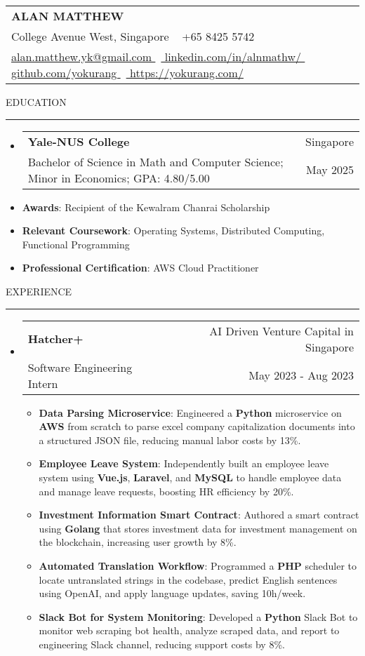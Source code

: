 \documentclass[letterpaper, 11pt]{article}
\makeatletter
\def\sectionlineskip{\medskip}
\def\sectionskip{\medskip}
\def\namesize{\LARGE}
\newcommand{\ResumeHeader}[6]{
  \noindent
  \begin{tabularx}{\textwidth}{>{\centering\arraybackslash}X}
    \namesize\MakeUppercase{\textbf{\fullname}} \\
    #1 \textbar\ #2 \\
    #3 \textbar\ #4 \textbar\ #5 \textbar\ #6 \\
  \end{tabularx}
}
\def \fullname { Alan Matthew }
\def \linkedinlink { https://www.linkedin.com/in/alnmathw/ }
\def \linkedintext { linkedin.com/in/alnmathw/ }
\def \phonenumber { +65 8425 5742 }
\def \githublink { https://github.com/yokurang }
\def \githubtext { github.com/yokurang }
\def \emaillink { mailto:alan.matthew.yk@gmail.com }
\def \emailtext { alan.matthew.yk@gmail.com }
\def \websitelink { https://yokurang.com/ }
\def \websitetext { https://yokurang.com/ }
\def \address { 28 College Avenue West, Singapore }
\def \headertype {\ResumeHeader}
\def \linkedin {\href{\linkedinlink}{\linkedintext}}
\def \phone {{\phonenumber}}
\def \email {\href{\emaillink}{\emailtext}}
\def \github {\href{\githublink}{\githubtext}}
\def \website {\href{\websitelink}{\websitetext}}
\newcommand{\SectionHeading}[1]{
  \sectionskip
  \raggedright\raggedbottom\MakeUppercase{\large{#1}}
  \sectionlineskip
  \hrule
  \color{black}
}
\newcommand{\ResumeEntryTSDL}[4]{
  \vspace{-1pt}\item
    \begin{tabular*}{\textwidth}[t]{l@{\extracolsep{\fill}}r} 
      \textbf{#1} & #2 \\
      #3 & #4 \\
    \end{tabular*}\vspace{-4pt}
}
\newcommand{\ResumeItem}[2]{
  \item{
    \textbf{#1}{: #2 \vspace{-2pt}}
  }
}
\newcommand{\ResumeSubItem}[2]{\ResumeItem{#1}{#2}\vspace{-4pt}}
\newcommand{\ResumeEntryStart}{\begin{itemize}[leftmargin=2mm, label={}]}
\newcommand{\ResumeEntryEnd}{\end{itemize}\vspace{-7pt}}
\newcommand{\ResumeItemListStart}{\begin{itemize}[leftmargin=5mm, label=$\bullet$]}
\newcommand{\ResumeItemListEnd}{\end{itemize}}
\makeatother
\begin{document}
  \headertype{\address}{\phone}{\email}{\linkedin}{\github}{\website}
  
  \SectionHeading{Education}
  \ResumeEntryStart
    \ResumeEntryTSDL{Yale-NUS College} {Singapore}
    {Bachelor of Science in Math and Computer Science; Minor in Economics; GPA: 4.80/5.00} {May 2025}
    \ResumeSubItem{Awards}{Recipient of the Kewalram Chanrai Scholarship}
    \ResumeSubItem{Relevant Coursework}{Operating Systems, Distributed Computing, Functional Programming}
    \ResumeSubItem{Professional Certification}{AWS Cloud Practitioner}
  \ResumeEntryEnd

  \vspace{5pt}

  \SectionHeading{Experience}
  \ResumeEntryStart
    \ResumeEntryTSDL{Hatcher+}{AI Driven Venture Capital in Singapore}{Software Engineering Intern}{May 2023 - Aug 2023}
    \ResumeItemListStart
      \ResumeItem{Data Parsing Microservice}
      {Engineered a \textbf{Python} microservice on \textbf{AWS} from scratch to parse excel company capitalization documents into a structured JSON file, reducing manual labor costs by 13\%.}

      \ResumeItem{Employee Leave System}
      {Independently built an employee leave system using \textbf{Vue.js}, \textbf{Laravel}, and \textbf{MySQL} to handle employee data and manage leave requests, boosting HR efficiency by 20\%.}

      \ResumeItem{Investment Information Smart Contract}
      {Authored a smart contract using \textbf{Golang} that stores investment data for investment management on the blockchain, increasing user growth by 8\%.}

      \ResumeItem{Automated Translation Workflow}
      {Programmed a \textbf{PHP} scheduler to locate untranslated strings in the codebase, predict English sentences using OpenAI, and apply language updates, saving 10h/week.}

      \ResumeItem{Slack Bot for System Monitoring}
      {Developed a \textbf{Python} Slack Bot to monitor web scraping bot health, analyze scraped data, and report to engineering Slack channel, reducing support costs by 8\%.}
    \ResumeItemListEnd
  \ResumeEntryEnd
\end{document}
